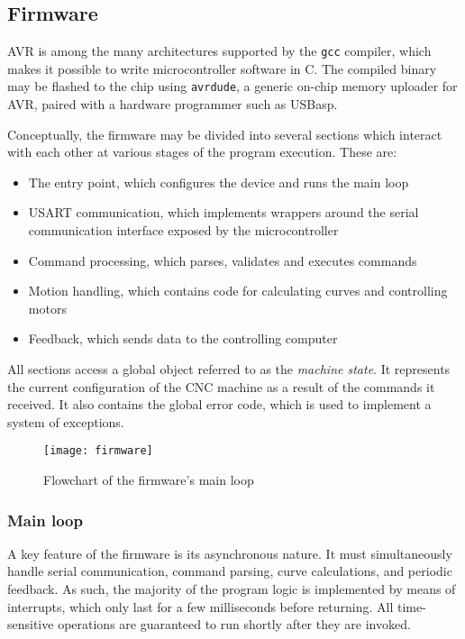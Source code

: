 \subsection{Firmware}

AVR is among the many architectures supported by the \texttt{gcc} compiler,
which makes it possible to write microcontroller software in C. The compiled
binary may be flashed to the chip using \texttt{avrdude}, a generic
on-chip memory uploader for AVR, paired with a hardware programmer such as
USBasp.

Conceptually, the firmware may be divided into several sections which interact
with each other at various stages of the program execution. These are:
\begin{itemize}
    \item The entry point, which configures the device and runs the main loop
    \item USART communication, which implements wrappers around the serial
    communication interface exposed by the microcontroller
    \item Command processing, which parses, validates and executes commands
    \item Motion handling, which contains code for calculating curves and
    controlling motors
    \item Feedback, which sends data to the controlling computer
\end{itemize}
All sections access a global object referred to as the \textit{machine state}.
It represents the current configuration of the CNC machine as a result of the
commands it received. It also contains the global error code, which is used to
implement a system of exceptions.

\begin{figure}[ht]
    \begin{center}
        \texttt{[image: firmware]}
        \caption{Flowchart of the firmware's main loop}
    \end{center}
\end{figure}

\subsubsection{Main loop}

A key feature of the firmware is its asynchronous nature. It must simultaneously
handle serial communication, command parsing, curve calculations, and periodic
feedback. As such, the majority of the program logic is implemented by means of
interrupts, which only last for a few milliseconds before returning. All
time-sensitive operations are guaranteed to run shortly after they are invoked.

